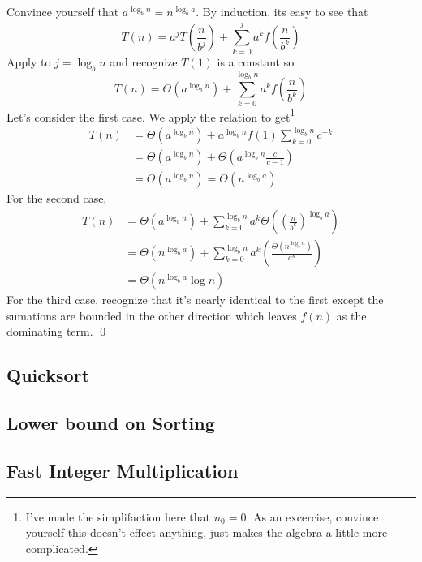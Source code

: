 \documentclass[10pt]{article}
\theoremstyle{plain}
\theoremstyle{definition}
\numberwithin{equation}{section}
\numberwithin{figure}{section}
\begin{document}
\proof Convince yourself that $a^{\log_b n} = n^{\log_b a}$. By induction, its easy to see that 
\begin{equation}
T(n) = a^j T\left(\frac{n}{b^j}\right) + \sum_{k = 0}^j a^k f\left(\frac{n}{b^k}\right)
\end{equation}
Apply to $j = \log_b n$ and recognize $T(1)$ is a constant so
\begin{equation}
T(n) = \Theta(a^{\log_b n}) + \sum_{k = 0}^{\log_b n} a^k f\left(\frac{n}{b^k}\right)
\end{equation}
Let's consider the first case. We apply the relation to get\footnote{I've made the simplifaction here that $n_0 = 0$. As an excercise, convince yourself this doesn't effect anything, just makes the algebra a little more complicated.} 
\begin{equation}
\begin{aligned}
T(n) &= \Theta(a^{\log_b n}) + a^{\log_b n} f(1) \sum_{k = 0}^{\log_b n} c^{-k} \\
&= \Theta(a^{\log_b n}) + \Theta \left(a^{\log_b n} \frac{c}{c-1}\right) \\
&= \Theta(a^{\log_b n}) = \Theta(n^{\log_b a})
\end{aligned}
\end{equation}
For the second case,
\begin{equation}
\begin{aligned}
T(n) &= \Theta(a^{\log_b n}) + \sum_{k = 0}^{\log_b n} a^k \Theta \left( \left( \frac{n}{b^k} \right)^{\log_b a} \right) \\
&= \Theta(n^{\log_b a}) + \sum_{k = 0}^{\log_b n} a^k \left( \frac{\Theta(n^{\log_b a})}{a^k} \right) \\
&= \Theta(n^{\log_b a} \log n)
\end{aligned}
\end{equation}
For the third case, recognize that it's nearly identical to the first except the sumations are bounded in the other direction which leaves $f(n)$ as the dominating term. \qed

\subsection{Quicksort}

\subsection{Lower bound on Sorting}

\subsection{Fast Integer Multiplication}
\end{document}
